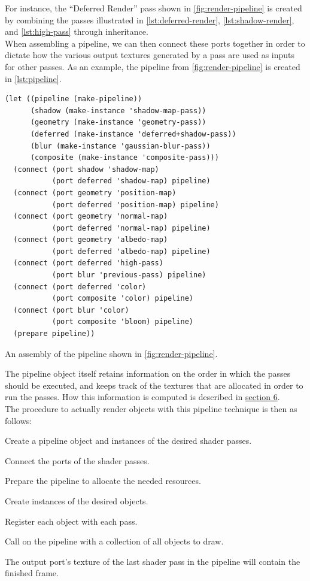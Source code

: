 \documentclass[format=sigconf]{acmart}
\begin{document}
For instance, the ``Deferred Render'' pass shown in \autoref{fig:render-pipeline} is created by combining the passes illustrated in \autoref{lst:deferred-render}, \autoref{lst:shadow-render}, and \autoref{lst:high-pass} through inheritance. \\

When assembling a pipeline, we can then connect these ports together in order to dictate how the various output textures generated by a pass are used as inputs for other passes. As an example, the pipeline from \autoref{fig:render-pipeline} is created in \autoref{lst:pipeline}. \\

\begin{listing}[h]
\begin{verbatim}
(let ((pipeline (make-pipeline))
      (shadow (make-instance 'shadow-map-pass))
      (geometry (make-instance 'geometry-pass))
      (deferred (make-instance 'deferred+shadow-pass))
      (blur (make-instance 'gaussian-blur-pass))
      (composite (make-instance 'composite-pass)))
  (connect (port shadow 'shadow-map) 
           (port deferred 'shadow-map) pipeline)
  (connect (port geometry 'position-map)
           (port deferred 'position-map) pipeline)
  (connect (port geometry 'normal-map)
           (port deferred 'normal-map) pipeline)
  (connect (port geometry 'albedo-map)
           (port deferred 'albedo-map) pipeline)
  (connect (port deferred 'high-pass)
           (port blur 'previous-pass) pipeline)
  (connect (port deferred 'color)
           (port composite 'color) pipeline)
  (connect (port blur 'color)
           (port composite 'bloom) pipeline)
  (prepare pipeline))
\end{verbatim}
\caption{An assembly of the pipeline shown in \autoref{fig:render-pipeline}.}
\label{lst:pipeline}
\end{listing}

The pipeline object itself retains information on the order in which the passes should be executed, and keeps track of the textures that are allocated in order to run the passes. How this information is computed is described in \hyperref[allocation]{section 6}. \\

The procedure to actually render objects with this pipeline technique is then as follows:

\begin{step}
\item Create a pipeline object and instances of the desired shader passes.
\item Connect the ports of the shader passes.
\item Prepare the pipeline to allocate the needed resources.
\item Create instances of the desired objects.
\item Register each object with each pass.
\item Call  on the pipeline with a collection of all objects to draw.
\item The output port's texture of the last shader pass in the pipeline will contain the finished frame.
\end{step}
\end{document}
